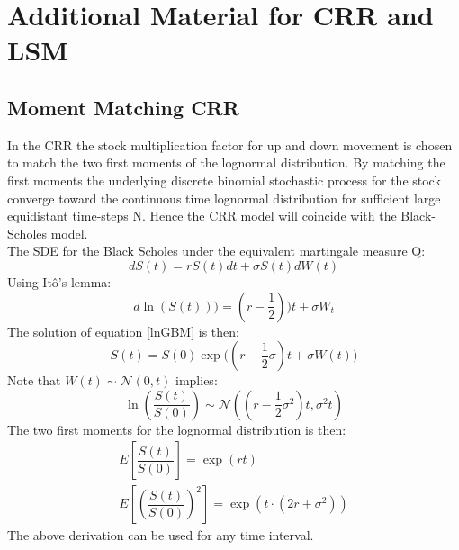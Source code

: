 
\chapter{Additional Material for CRR and LSM} %

\label{AppendixC} %

\section{Moment Matching CRR}\label{CRRMM}
In the CRR the stock multiplication factor for up and down movement is chosen to match the two first moments of the lognormal distribution. By matching the first moments the underlying discrete binomial stochastic process for the stock converge toward the continuous time lognormal distribution for sufficient large equidistant time-steps N. Hence the CRR model will coincide with the Black-Scholes model.\\

The SDE for the Black Scholes under the equivalent martingale measure Q:
$$dS(t)=rS(t)dt + \sigma S(t) dW(t)$$
Using Itô's lemma:
\begin{equation}\label{lnGBM}
d\ln(S(t)))=(r-\frac{1}{2}))t + \sigma W_t
\end{equation}
The solution of equation \ref{lnGBM} is then:
$$S(t)=S(0)\exp\bigg((r-\dfrac{1}{2}\sigma)t+ \sigma W(t) \bigg)$$
Note that $W(t)\sim \mathcal{N}(0,t)$ implies:
$$\ln(\dfrac{S(t)}{S(0)}) \sim \mathcal{N}((r-\dfrac{1}{2}\sigma^2)t, \sigma^2 t)$$
The two first moments for the lognormal distribution is then:
\begin{equation}\label{lnMoments}
\begin{split}
E[\dfrac{S(t)}{S(0)}]=\exp(rt)\\
E[(\dfrac{S(t)}{S(0)})^2]=\exp(t\cdot (2r + \sigma^2))
\end{split}
\end{equation}
The above derivation can be used for any time interval.\\

